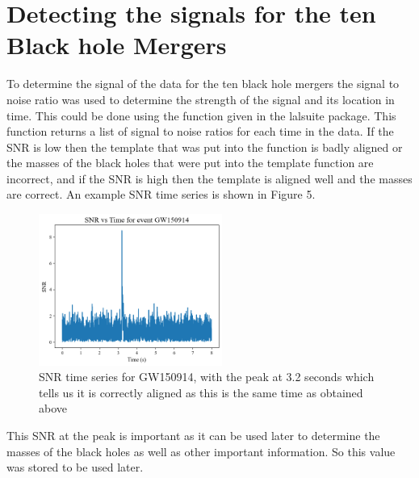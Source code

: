\documentclass[]{article}
\begin{document}
\section*{Detecting the signals for the ten Black hole Mergers}
To determine the signal of the data for the ten black hole mergers the signal
to noise ratio was used to determine the strength of the signal and its location in time.
This could be done using the function given in the lalsuite package. This function
returns a list of signal to noise ratios for each time in the data. If the SNR is low then the
template that was put into the function is badly aligned or the masses of the black holes
that were put into the template function are incorrect, and if the SNR is high
then the template is aligned well and the masses are correct. An example SNR time series
is shown in Figure 5.
\begin{figure}[h]
    \includegraphics[width=6cm]{images/SNR_gw150914.png}
    \caption{SNR time series for GW150914, with the peak at 3.2 seconds which tells
    us it is correctly aligned as this is the same time as obtained above}
    \label{fig:SNR}
\end{figure}
This SNR at the peak is important as it can be used later to determine the masses of the
black holes as well as other important information. So this value was stored to be used later.
\end{document}

